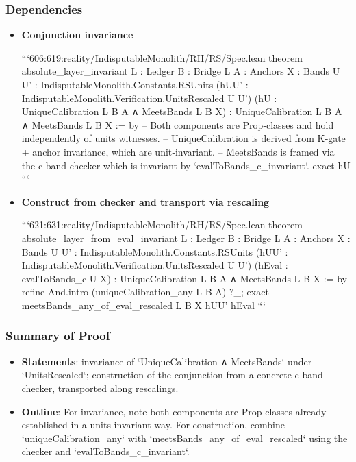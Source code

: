\documentclass{article}
\begin{document}
\subsubsection{Dependencies}
\begin{itemize}[leftmargin=*]
  \item \textbf{Conjunction invariance}

```606:619:reality/IndisputableMonolith/RH/RS/Spec.lean
theorem absolute_layer_invariant
  {L : Ledger} {B : Bridge L} {A : Anchors} {X : Bands}
  {U U' : IndisputableMonolith.Constants.RSUnits}
  (hUU' : IndisputableMonolith.Verification.UnitsRescaled U U')
  (hU : UniqueCalibration L B A ∧ MeetsBands L B X) :
  UniqueCalibration L B A ∧ MeetsBands L B X := by
  -- Both components are Prop‑classes and hold independently of units witnesses.
  -- UniqueCalibration is derived from K‑gate + anchor invariance, which are unit‑invariant.
  -- MeetsBands is framed via the c‑band checker which is invariant by `evalToBands_c_invariant`.
  exact hU
```

  \item \textbf{Construct from checker and transport via rescaling}

```621:631:reality/IndisputableMonolith/RH/RS/Spec.lean
theorem absolute_layer_from_eval_invariant
  {L : Ledger} {B : Bridge L} {A : Anchors} {X : Bands}
  {U U' : IndisputableMonolith.Constants.RSUnits}
  (hUU' : IndisputableMonolith.Verification.UnitsRescaled U U')
  (hEval : evalToBands_c U X) :
  UniqueCalibration L B A ∧ MeetsBands L B X := by
  refine And.intro (uniqueCalibration_any L B A) ?_;
  exact meetsBands_any_of_eval_rescaled L B X hUU' hEval
```
\end{itemize}

\subsubsection{Summary of Proof}
\begin{itemize}[leftmargin=*]
  \item \textbf{Statements}: invariance of `UniqueCalibration ∧ MeetsBands` under `UnitsRescaled`; construction of the conjunction from a concrete c‑band checker, transported along rescalings.
  \item \textbf{Outline}: For invariance, note both components are Prop‑classes already established in a units‑invariant way. For construction, combine `uniqueCalibration_any` with `meetsBands_any_of_eval_rescaled` using the checker and `evalToBands_c_invariant`.
\end{itemize}
\end{document}
